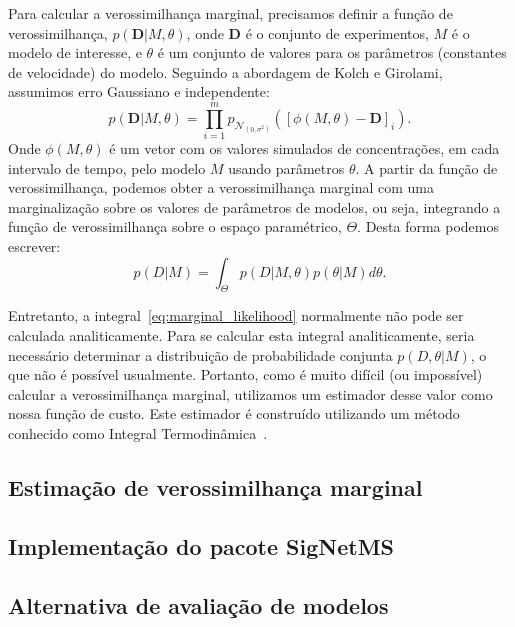 \documentclass[12pt]{article}
\begin{document}
Para calcular a verossimilhança marginal, precisamos definir a função de
verossimilhança, $p(\mathbf{D} | M, \theta)$, onde $\mathbf{D}$ é o 
conjunto de experimentos, $M$ é o modelo de interesse, e $\theta$ é um
conjunto de valores para os parâmetros (constantes de velocidade) do
modelo. Seguindo a abordagem de Kolch e Girolami, assumimos erro
Gaussiano e independente:
\begin{equation}
    p (\mathbf{D} | M, \theta) = \prod_{i = 1}^m
    p_{\mathcal{N}_{\left(0, \sigma^2\right)}} ([\phi (M,\theta) -
    \mathbf{D}]_i).
\label{eq:likelihood}
\end{equation}
Onde $\phi (M, \theta)$ é um vetor com os valores simulados de 
concentrações, em cada intervalo de tempo, pelo modelo $M$ usando 
parâmetros $\theta$. A partir da função de verossimilhança, podemos
obter a verossimilhança marginal com uma marginalização sobre os valores
de parâmetros de modelos, ou seja, integrando a função de 
verossimilhança sobre o espaço paramétrico, $\Theta$. Desta forma
podemos escrever:
\begin{equation}
    p (D | M) = \int_{\Theta} p (D | M, \theta) p (\theta | M)d\theta.
\label{eq:marginal_likelihood}
\end{equation}

Entretanto, a integral~\ref{eq:marginal_likelihood} normalmente não pode
ser calculada analiticamente. Para se calcular esta integral
analiticamente, seria necessário determinar a distribuição de 
probabilidade conjunta $p(D, \theta | M)$, o que não é possível
usualmente. Portanto, como é muito difícil (ou impossível) calcular a
verossimilhança marginal, utilizamos um estimador desse valor como nossa
função de custo. Este estimador é construído utilizando um método
conhecido como Integral Termodinâmica~\cite{Friel2008}.

\subsection{Estimação de verossimilhança marginal}

\subsection{Implementação do pacote SigNetMS}

\subsection{Alternativa de avaliação de modelos}
\end{document}
